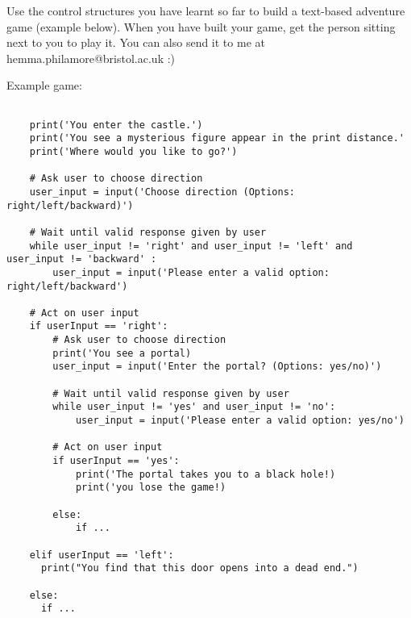 \documentclass[11pt]{report}
\begin{document}
\begin{Exercise}[title=Text based adventure game]

Use the control structures you have learnt so far to build a text-based adventure game (example below). When you have built your game, get the person sitting next to you to play it. You can also send it to me at hemma.philamore@bristol.ac.uk :)

Example game:

\begin{verbatim}

    print('You enter the castle.')
    print('You see a mysterious figure appear in the print distance.'
    print('Where would you like to go?')

    # Ask user to choose direction
    user_input = input('Choose direction (Options: right/left/backward)')
    
    # Wait until valid response given by user
    while user_input != 'right' and user_input != 'left' and user_input != 'backward' :
        user_input = input('Please enter a valid option: right/left/backward')

    # Act on user input
    if userInput == 'right':
        # Ask user to choose direction
        print('You see a portal)
        user_input = input('Enter the portal? (Options: yes/no)')
        
        # Wait until valid response given by user
        while user_input != 'yes' and user_input != 'no':
            user_input = input('Please enter a valid option: yes/no')
    
        # Act on user input
        if userInput == 'yes':
            print('The portal takes you to a black hole!)
            print('you lose the game!)

        else:
            if ...
      
    elif userInput == 'left':
      print("You find that this door opens into a dead end.")
      
    else:
      if ...
    
\end{verbatim}
    
\end{Exercise}
\end{document}
